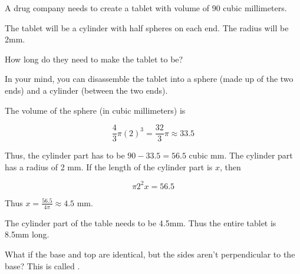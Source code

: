 \begin{Exercise}[title={Tablet}, label=tablet]

  A drug company needs to create a tablet with volume of 90 cubic millimeters.

  The tablet will be a cylinder with half spheres on each end.  The radius will be 2mm.

  How long do they need to make the tablet to be?

  \vspace{2mm}
  
  

\end{Exercise}
\begin{Answer}[ref=tablet]
  In your mind, you can disassemble the tablet into a sphere (made up of
  the two ends) and a cylinder (between the two ends).
  
  The volume of the sphere (in cubic millimeters) is

  $$\frac{4}{3}\pi (2)^3 =\frac{32}{3}\pi \approx 33.5$$

  Thus, the cylinder part has to be $90 - 33.5 = 56.5$ cubic mm. The
  cylinder part has a radius of 2 mm. If the length of the cylinder
  part is $x$, then

  $$\pi 2^2 x = 56.5$$

  Thus $x = \frac{56.5}{4 \pi} \approx 4.5$ mm.

  The cylinder part of the table needs to be 4.5mm.  Thus the entire tablet is 8.5mm long.
  
\end{Answer}

What if the base and top are identical, but the sides aren't
perpendicular to the base? This is called .

